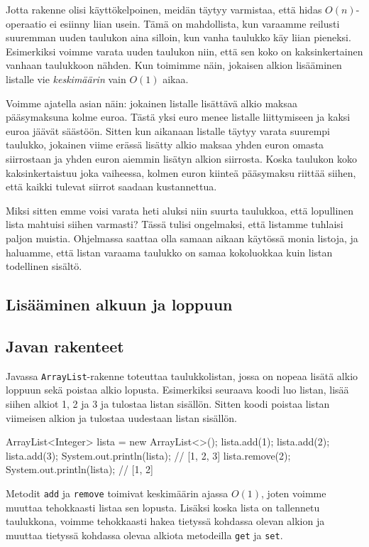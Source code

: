 Jotta rakenne olisi käyttökelpoinen, meidän täytyy varmistaa,
että hidas $O(n)$-operaatio ei esiinny liian usein.
Tämä on mahdollista, kun varaamme reilusti suuremman uuden taulukon
aina silloin, kun vanha taulukko käy liian pieneksi.
Esimerkiksi voimme varata uuden taulukon niin,
että sen koko on kaksinkertainen vanhaan taulukkoon nähden.
Kun toimimme näin, jokaisen alkion lisääminen listalle vie
\emph{keskimäärin} vain $O(1)$ aikaa.

Voimme ajatella asian näin: jokainen listalle lisättävä alkio
maksaa pääsy\-maksuna kolme euroa.
Tästä yksi euro menee listalle liittymiseen ja kaksi euroa jäävät säästöön.
Sitten kun aikanaan listalle täytyy varata suurempi taulukko,
jokainen viime erässä lisätty alkio maksaa yhden euron omasta siirrostaan
ja yhden euron aiemmin lisätyn alkion siirrosta.
Koska taulukon koko kaksinkertaistuu joka vaiheessa,
kolmen euron kiinteä pääsymaksu riittää siihen, että kaikki tulevat
siirrot saadaan kustannettua.

Miksi sitten emme voisi varata heti aluksi niin suurta taulukkoa,
että lopullinen lista mahtuisi siihen varmasti?
Tässä tulisi ongelmaksi, että listamme tuhlaisi paljon muistia.
Ohjelmassa saattaa olla samaan aikaan käytössä monia listoja,
ja haluamme, että listan varaama taulukko on samaa kokoluokkaa
kuin listan todellinen sisältö.

\subsection{Lisääminen alkuun ja loppuun}

\subsection{Javan rakenteet}

Javassa \texttt{ArrayList}-rakenne toteuttaa taulukkolistan,
jossa on nopeaa lisätä alkio loppuun sekä poistaa alkio lopusta.
Esimerkiksi seuraava koodi luo listan, lisää siihen alkiot
1, 2 ja 3 ja tulostaa listan sisällön.
Sitten koodi poistaa listan viimeisen alkion ja
tulostaa uudestaan listan sisällön.

\begin{code}
ArrayList<Integer> lista = new ArrayList<>();
lista.add(1);
lista.add(2);
lista.add(3);
System.out.println(lista); // [1, 2, 3]
lista.remove(2);
System.out.println(lista); // [1, 2]
\end{code}

Metodit \texttt{add} ja \texttt{remove}
toimivat keskimäärin ajassa $O(1)$,
joten voimme muuttaa tehokkaasti listaa sen lopusta.
Lisäksi koska lista on tallennetu taulukkona,
voimme tehokkaasti hakea tietyssä kohdassa olevan alkion
ja muuttaa tietyssä kohdassa olevaa alkiota
metodeilla \texttt{get} ja \texttt{set}.

